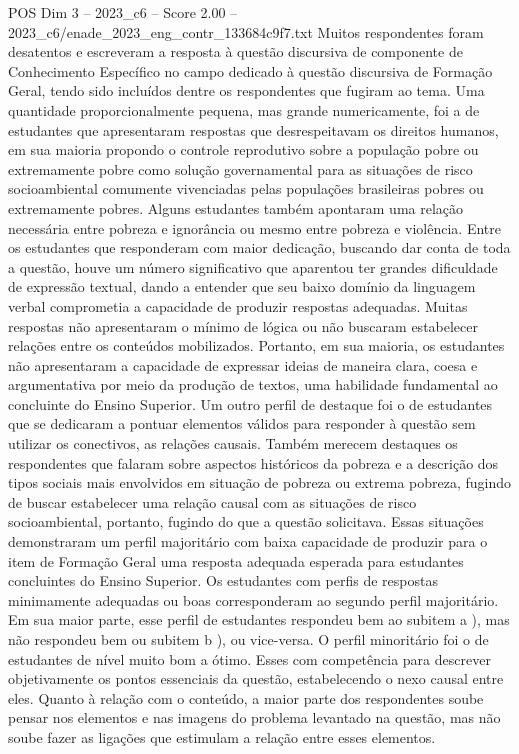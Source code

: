 \begin{textsample}{POS Dim 3 – 2023\_c6 – Score 2.00 – 2023\_c6/enade\_2023\_eng\_contr\_133684c9f7.txt}
Muitos respondentes foram desatentos e escreveram a resposta à questão discursiva de componente de Conhecimento Específico no campo dedicado à questão discursiva de Formação Geral, tendo sido incluídos dentre os respondentes que fugiram ao tema.
Uma quantidade proporcionalmente pequena, mas grande numericamente, foi a de estudantes que apresentaram respostas que desrespeitavam os direitos humanos, em sua maioria propondo o controle reprodutivo sobre a população pobre ou extremamente pobre como solução governamental para as situações de risco socioambiental comumente vivenciadas pelas populações brasileiras pobres ou extremamente pobres.
Alguns estudantes também apontaram uma relação necessária entre pobreza e ignorância ou mesmo entre pobreza e violência.
Entre os estudantes que responderam com maior dedicação, buscando dar conta de toda a questão, houve um número significativo que aparentou ter grandes dificuldade de expressão textual, dando a entender que seu baixo domínio da linguagem verbal comprometia a capacidade de produzir respostas adequadas.
Muitas respostas não apresentaram o mínimo de lógica ou não buscaram estabelecer relações entre os conteúdos mobilizados.
Portanto, em sua maioria, os estudantes não apresentaram a capacidade de expressar ideias de maneira clara, coesa e argumentativa por meio da produção de textos, uma habilidade fundamental ao concluinte do Ensino Superior.
Um outro perfil de destaque foi o de estudantes que se dedicaram a pontuar elementos válidos para responder à questão sem utilizar os conectivos, as relações causais.
Também merecem destaques os respondentes que falaram sobre aspectos históricos da pobreza e a descrição dos tipos sociais mais envolvidos em situação de pobreza ou extrema pobreza, fugindo de buscar estabelecer uma relação causal com as situações de risco socioambiental, portanto, fugindo do que a questão solicitava.
Essas situações demonstraram um perfil majoritário com baixa capacidade de produzir para o item de Formação Geral uma resposta adequada esperada para estudantes concluintes do Ensino Superior.
Os estudantes com perfis de respostas minimamente adequadas ou boas corresponderam ao segundo perfil majoritário.
Em sua maior parte, esse perfil de estudantes respondeu bem ao subitem a ), mas não respondeu bem ou subitem b ), ou vice-versa.
O perfil minoritário foi o de estudantes de nível muito bom a ótimo.
Esses com competência para descrever objetivamente os pontos essenciais da questão, estabelecendo o nexo causal entre eles.
Quanto à relação com o conteúdo, a maior parte dos respondentes soube pensar nos elementos e nas imagens do problema levantado na questão, mas não soube fazer as ligações que estimulam a relação entre esses elementos.

\end{textsample}
